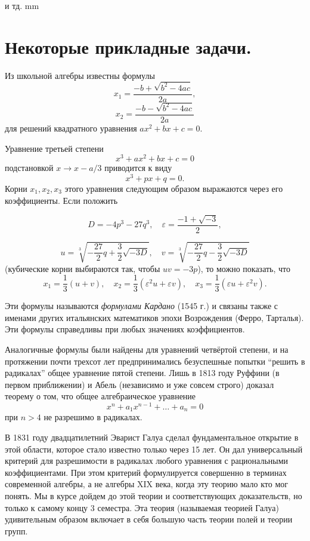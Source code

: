 \documentclass[12pt,english,russian]{article}
\begin{document}
	и тд.
	 mm
	

	
	\section{\bf Некоторые прикладные задачи.}
	
	Из школьной алгебры известны формулы
	$$x_1=\frac{-b+\sqrt{b^2-4ac}}{2a},$$
	$$x_2=\frac{-b-\sqrt{b^2-4ac}}{2a}$$ 
	для решений квадратного уравнения $ax^2+bx+c=0$.
	
	Уравнение третьей степени
	$$x^3+ax^2+bx+c=0$$
	подстановкой $x \to x-a/3$ приводится к виду
	$$x^3+px+q=0.$$
	Корни $x_1, x_2, x_3$
	этого уравнения следующим образом выражаются 
	через его коэффициенты. Если положить
	
	$$
		D=-4p^3-27q^3, \quad \varepsilon=\frac{-1+\sqrt{-3}}{2},
	$$
	
	$$
		u=\sqrt[3]{-\frac{27}{2}q+\frac{3}{2}\sqrt{-3D}}, \quad v=\sqrt[3]{-\frac{27}{2}q-\frac{3}{2}\sqrt{-3D}}
	$$
	(кубические корни выбираются так, чтобы $uv=-3p$), то можно
	показать, что
	$$x_1=\frac{1}{3}(u+v), \quad x_2=\frac{1}{3}(\varepsilon^2u+\varepsilon v), \quad x_3=\frac{1}{3}(\varepsilon u+\varepsilon^2v).$$
	
	Эти формулы называются
	\textit{формулами Кардано}
	(1545 г.) и связаны 
	также с именами других итальянских математиков эпохи
	Возрождения (Ферро, Тарталья). Эти формулы 
	справедливы при
	любых значениях коэффициентов.
	
	Аналогичные формулы были найдены для уравнений четвёртой 
	степени, и на протяжении почти трехсот лет предпринимались 
	безуспешные попытки “решить в радикалах” общее уравнение 
	пятой степени. Лишь в 1813 году Руффини (в первом приближении) и Абель (независимо и уже совсем строго) доказал
	теорему о том, что общее алгебраическое уравнение
	$$x^n+a_1x^{n-1}+ \dots +a_n=0$$ при $n > 4$
	не разрешимо в радикалах.

	В 1831 году двадцатилетний Эварист Галуа сделал фундаментальное открытие
	 в этой области, которое стало известно только
	через 15 лет. Он дал универсальный критерий для разрешимости в
	радикалах любого уравнения с рациональными коэффициентами.
	При этом критерий формулируется совершенно в терминах современной алгебры, а не алгебры XIX века, когда эту теорию мало
	кто мог понять. Мы в курсе дойдем до этой теории и соответствующих доказательств, но только к самому концу 3 семестра.
	Эта теория (называемая теорией Галуа) удивительным образом
	включает в себя большую часть теории полей и теории групп.
\end{document}
